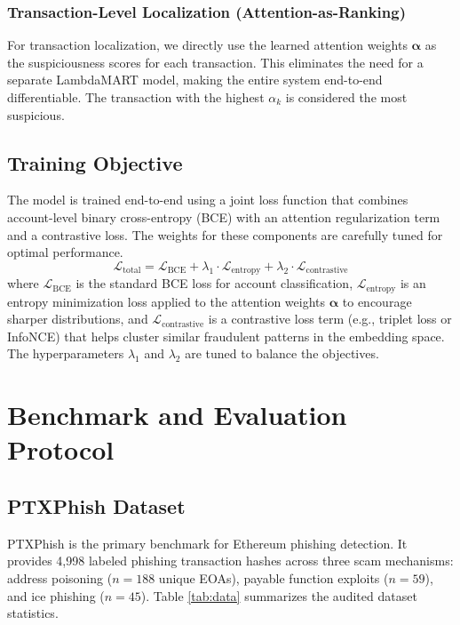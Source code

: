 \documentclass[conference]{IEEEtran}
\begin{document}
\subsubsection{Transaction-Level Localization (Attention-as-Ranking)}
For transaction localization, we directly use the learned attention weights $\boldsymbol{\alpha}$ as the suspiciousness scores for each transaction. This eliminates the need for a separate LambdaMART model, making the entire system end-to-end differentiable. The transaction with the highest $\alpha_k$ is considered the most suspicious.

\subsection{Training Objective}
The model is trained end-to-end using a joint loss function that combines account-level binary cross-entropy (BCE) with an attention regularization term and a contrastive loss. The weights for these components are carefully tuned for optimal performance.
\begin{equation}
\mathcal{L}_{\text{total}} = \mathcal{L}_{\text{BCE}} + \lambda_1 \cdot \mathcal{L}_{\text{entropy}} + \lambda_2 \cdot \mathcal{L}_{\text{contrastive}}
\end{equation}
where $\mathcal{L}_{\text{BCE}}$ is the standard BCE loss for account classification, $\mathcal{L}_{\text{entropy}}$ is an entropy minimization loss applied to the attention weights $\boldsymbol{\alpha}$ to encourage sharper distributions, and $\mathcal{L}_{\text{contrastive}}$ is a contrastive loss term (e.g., triplet loss or InfoNCE) that helps cluster similar fraudulent patterns in the embedding space. The hyperparameters $\lambda_1$ and $\lambda_2$ are tuned to balance the objectives.

\section{Benchmark and Evaluation Protocol}
\subsection{PTXPhish Dataset}
PTXPhish \cite{ptxphish} is the primary benchmark for Ethereum phishing detection. It provides 4,998 labeled phishing transaction hashes across three scam mechanisms: address poisoning ($n=188$ unique EOAs), payable function exploits ($n=59$), and ice phishing ($n=45$). Table \ref{tab:data} summarizes the audited dataset statistics.
\end{document}
